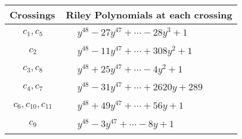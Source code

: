 \documentclass[1p]{elsarticle_modified}
\theoremstyle{definition}
\begin{document}
\begin{tabular}{m{50pt}|m{274pt}}
Crossings & \hspace{64pt}Riley Polynomials at each crossing \\
\hline $$\begin{aligned}c_{1},c_{5}\end{aligned}$$&$\begin{aligned}
&y^{48}-27 y^{47}+\cdots-28 y^3+1
\end{aligned}$\\
\hline $$\begin{aligned}c_{2}\end{aligned}$$&$\begin{aligned}
&y^{48}-11 y^{47}+\cdots+308 y^2+1
\end{aligned}$\\
\hline $$\begin{aligned}c_{3},c_{8}\end{aligned}$$&$\begin{aligned}
&y^{48}+25 y^{47}+\cdots-4 y^2+1
\end{aligned}$\\
\hline $$\begin{aligned}c_{4},c_{7}\end{aligned}$$&$\begin{aligned}
&y^{48}-31 y^{47}+\cdots+2620 y+289
\end{aligned}$\\
\hline $$\begin{aligned}c_{6},c_{10},c_{11}\end{aligned}$$&$\begin{aligned}
&y^{48}+49 y^{47}+\cdots+56 y+1
\end{aligned}$\\
\hline $$\begin{aligned}c_{9}\end{aligned}$$&$\begin{aligned}
&y^{48}-3 y^{47}+\cdots-8 y+1
\end{aligned}$\\
\hline
\end{tabular}
\vskip 2pc
\end{document}
